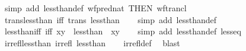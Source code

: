 \begin{isabellebody}
\ {\isacharparenleft}{\kern0pt}simp\ add{\isacharcolon}{\kern0pt}\ less{\isacharunderscore}{\kern0pt}than{\isacharunderscore}{\kern0pt}def\ wf{\isacharunderscore}{\kern0pt}pred{\isacharunderscore}{\kern0pt}nat\ {\isacharbrackleft}{\kern0pt}THEN\ wf{\isacharunderscore}{\kern0pt}trancl{\isacharbrackright}{\kern0pt}{\isacharparenright}{\kern0pt}%
\endisatagproof
{\isafoldproof}%
%
\isadelimproof
\isanewline
%
\endisadelimproof
\isanewline
{}\isamarkupfalse%
\ trans{\isacharunderscore}{\kern0pt}less{\isacharunderscore}{\kern0pt}than\ {\isacharbrackleft}{\kern0pt}iff{\isacharbrackright}{\kern0pt}{\isacharcolon}{\kern0pt}\ {\isachardoublequoteopen}trans\ less{\isacharunderscore}{\kern0pt}than{\isachardoublequoteclose}\isanewline
%
\isadelimproof
\ \ %
\endisadelimproof
%
\isatagproof
{}\isamarkupfalse%
\ {\isacharparenleft}{\kern0pt}simp\ add{\isacharcolon}{\kern0pt}\ less{\isacharunderscore}{\kern0pt}than{\isacharunderscore}{\kern0pt}def{\isacharparenright}{\kern0pt}%
\endisatagproof
{\isafoldproof}%
%
\isadelimproof
\isanewline
%
\endisadelimproof
\isanewline
{}\isamarkupfalse%
\ less{\isacharunderscore}{\kern0pt}than{\isacharunderscore}{\kern0pt}iff\ {\isacharbrackleft}{\kern0pt}iff{\isacharbrackright}{\kern0pt}{\isacharcolon}{\kern0pt}\ {\isachardoublequoteopen}{\isacharparenleft}{\kern0pt}{\isacharparenleft}{\kern0pt}x{\isacharcomma}{\kern0pt}y{\isacharparenright}{\kern0pt}\ {\isasymin}\ less{\isacharunderscore}{\kern0pt}than{\isacharparenright}{\kern0pt}\ {\isacharequal}{\kern0pt}\ {\isacharparenleft}{\kern0pt}x{\isacharless}{\kern0pt}y{\isacharparenright}{\kern0pt}{\isachardoublequoteclose}\isanewline
%
\isadelimproof
\ \ %
\endisadelimproof
%
\isatagproof
{}\isamarkupfalse%
\ {\isacharparenleft}{\kern0pt}simp\ add{\isacharcolon}{\kern0pt}\ less{\isacharunderscore}{\kern0pt}than{\isacharunderscore}{\kern0pt}def\ less{\isacharunderscore}{\kern0pt}eq{\isacharparenright}{\kern0pt}%
\endisatagproof
{\isafoldproof}%
%
\isadelimproof
\isanewline
%
\endisadelimproof
\isanewline
{}\isamarkupfalse%
\ irrefl{\isacharunderscore}{\kern0pt}less{\isacharunderscore}{\kern0pt}than{\isacharcolon}{\kern0pt}\ {\isachardoublequoteopen}irrefl\ less{\isacharunderscore}{\kern0pt}than{\isachardoublequoteclose}\isanewline
%
\isadelimproof
\ \ %
\endisadelimproof
%
\isatagproof
{}\isamarkupfalse%
\ irrefl{\isacharunderscore}{\kern0pt}def\ \isamarkupfalse%
\ blast%
\endisatagproof
{\isafoldproof}%
%
\isadelimproof
\isanewline
%
\endisadelimproof
\isanewline
{}\isamarkupfalse%

\end{isabellebody}
